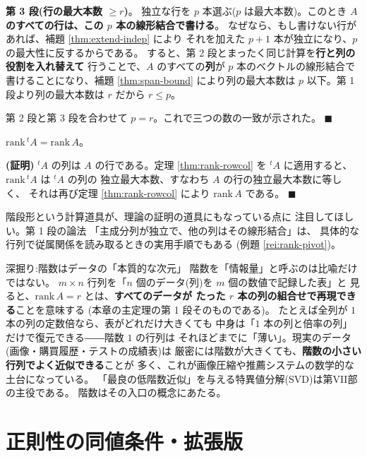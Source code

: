 \textbf{第 3 段(行の最大本数 $\ge r$)}。
独立な行を $p$ 本選ぶ($p$ は最大本数)。このとき
\textbf{$A$ のすべての行は、この $p$ 本の線形結合で書ける}。
なぜなら、もし書けない行があれば、補題 \ref{thm:extend-indep} により
それを加えた $p + 1$ 本が独立になり、$p$ の最大性に反するからである。
すると、第 2 段とまったく同じ計算を\textbf{行と列の役割を入れ替えて}
行うことで、$A$ のすべての\textbf{列}が $p$ 本のベクトルの線形結合で
書けることになり、補題 \ref{thm:span-bound} により列の最大本数は
$p$ 以下。第 1 段より列の最大本数は $r$ だから $r \le p$。

第 2 段と第 3 段を合わせて $p = r$。これで三つの数の一致が示された。
 $\blacksquare$

\begin{teiri}[系:転置と階数]\label{thm:rank-transpose}
$\mathrm{rank}\,{}^t\!A = \mathrm{rank}\,A$。
\end{teiri}

\noindent\textbf{(証明)}\quad
${}^t\!A$ の列は $A$ の行である。定理 \ref{thm:rank-rowcol} を
${}^t\!A$ に適用すると、$\mathrm{rank}\,{}^t\!A$ は ${}^t\!A$ の列の
独立最大本数、すなわち $A$ の行の独立最大本数に等しく、
それは再び定理 \ref{thm:rank-rowcol} により $\mathrm{rank}\,A$ である。
 $\blacksquare$

階段形という計算道具が、理論の証明の道具にもなっている点に
注目してほしい。第 1 段の論法
「主成分列が独立で、他の列はその線形結合」は、
具体的な行列で従属関係を読み取るときの実用手順でもある
(例題 \ref{rei:rank-pivot})。

\begin{itembox}[l]{深掘り:階数はデータの「本質的な次元」}
階数を「情報量」と呼ぶのは比喩だけではない。
$m \times n$ 行列を「$n$ 個のデータ(列)を $m$ 個の数値で記録した表」と
見ると、$\mathrm{rank}\,A = r$ とは、\textbf{すべてのデータが
たった $r$ 本の列の組合せで再現できる}ことを意味する
(本章の主定理の第 1 段そのものである)。
たとえば全列が $1$ 本の列の定数倍なら、表がどれだけ大きくても
中身は「$1$ 本の列と倍率の列」だけで復元できる――階数 $1$ の行列は
それほどまでに「薄い」。現実のデータ(画像・購買履歴・テストの成績表)は
厳密には階数が大きくても、\textbf{階数の小さい行列でよく近似できる}ことが
多く、これが画像圧縮や推薦システムの数学的な土台になっている。
「最良の低階数近似」を与える特異値分解(SVD)は第VII部の主役である。
階数はその入口の概念にあたる。
\end{itembox}

\section{正則性の同値条件・拡張版}

